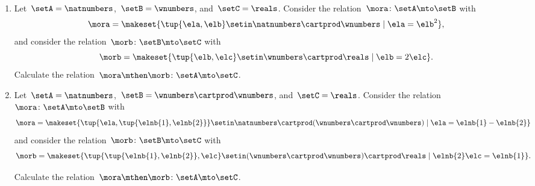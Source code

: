 

\begin{gradedexercise}[ComposingRelations]
    \
    \begin{enumerate}
        \item Let~$\setA = \natnumbers$,~$\setB = \wnumbers$, and~$\setC = \reals$.
              Consider the relation~$\mora \colon \setA \mto \setB$ with
              \begin{equation}
                  \mora = \makeset{ \tup{\ela, \elb} \setin \natnumbers \cartprod \wnumbers \mid \ela = \elb^2 },
              \end{equation}
              and consider the relation~$\morb \colon \setB \mto \setC$ with
              \begin{equation}
                  \morb = \makeset{ \tup{\elb, \elc} \setin \wnumbers \cartprod \reals \mid \elb = 2 \elc}.
              \end{equation}
              Calculate the relation~$\mora \mthen \morb \colon \setA \mto \setC$.

        \item Let~$\setA = \natnumbers$,~$\setB = \wnumbers \cartprod \wnumbers$, and~$\setC = \reals$.
              Consider the relation~$\mora \colon \setA \mto \setB$ with
              \begin{equation}
                  \mora = \makeset{\tup{\ela, \tup{\elnb{1}, \elnb{2}}} \setin \natnumbers \cartprod (\wnumbers \cartprod \wnumbers) \mid \ela = \elnb{1} - \elnb{2}}
              \end{equation}
              and consider the relation~$\morb \colon \setB \mto \setC$ with
              \begin{equation}
                  \morb = \makeset{ \tup{\tup{\elnb{1}, \elnb{2}}, \elc} \setin (\wnumbers \cartprod \wnumbers) \cartprod \reals \mid \elnb{2} \elc = \elnb{1}}.
              \end{equation}

              Calculate the relation~$\mora \mthen \morb \colon \setA \mto \setC$.
    \end{enumerate}
\end{gradedexercise}

